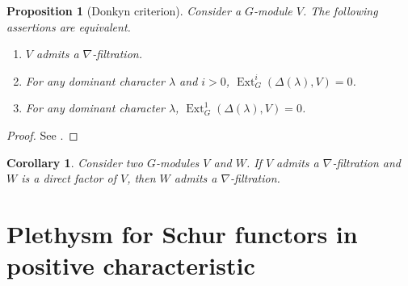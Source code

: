 \documentclass[11pt]{amsart}
\numberwithin{subsection}{section}
\numberwithin{figure}{section}
\numberwithin{table}{section}
\theoremstyle{1}
\newtheorem{proposition}[theorem]{Proposition}
\newtheorem{corollary}[theorem]{Corollary}
\theoremstyle{2}
\DeclareMathOperator{\Ext}{Ext}
\begin{document}
\begin{proposition}[Donkyn criterion]\label{propDonkyn}
Consider a $G$-module $V$. The following assertions are equivalent.
\begin{enumerate}
\item $V$ admits a $\nabla$-filtration.
\item For any dominant character $\lambda$ and $i>0$, $\Ext_G^i(\Delta(\lambda),V) = 0$.
\item For any dominant character $\lambda$, $\Ext_G^1(\Delta(\lambda),V) = 0$.
\end{enumerate} 
\end{proposition}
\begin{proof}
See \cite[Part II, sect. 4.16]{MR2015057}.
\end{proof}
\begin{corollary}\label{cor1}
Consider two $G$-modules $V$ and $W$. If $V$ admits a $\nabla$-filtration and $W$ is a direct factor of $V$, then $W$ admits a $\nabla$-filtration.
\end{corollary}
\section{Plethysm for Schur functors in positive characteristic}\label{sect_schur}
\end{document}
